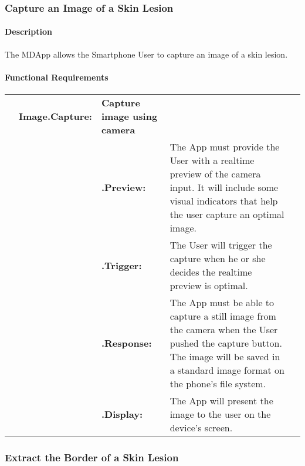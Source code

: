 {\renewcommand{\arraystretch}{1.8}%

        \subsubsection{Capture an Image of a Skin Lesion}
            \paragraph{Description}

            The MDApp allows the Smartphone User to capture an image of a skin lesion.

            \paragraph{Functional Requirements}



                \begin{longtable}[H]{ >{\bfseries}l >{\bfseries}l >{\bfseries}l p{8.5cm} l }

                    \hline
                    & \multicolumn{2}{>{\bfseries}l}
                    {Image.Capture:} & \textbf{Capture image using camera}  \\

                    & & .Preview: &  The App must provide the User with a realtime preview of the camera input. It will include some visual indicators that help the user capture an optimal image. \\

                    & & .Trigger: & The User will trigger the capture when he or she decides the realtime preview is optimal. \\

                    & & .Response: & The App must be able to capture a still image from the camera when the User pushed the capture button. The image will be saved in a standard image format on the phone’s file system. \\

                    & & .Display: & The App will present the image to the user on the device’s screen. \\

                    \hline
                \end{longtable}


        \subsubsection{Extract the Border of a Skin Lesion}

}

